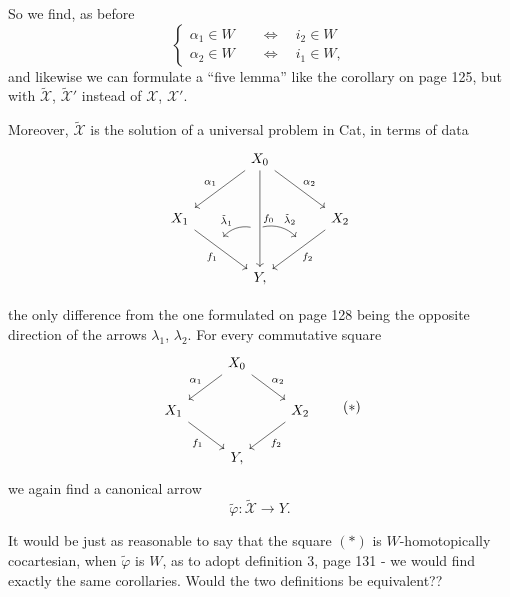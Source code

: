 \documentclass[11pt]{article}
\newcommand{\msp}[1]{\marginpar{\footnotesize [#1]}}
\newcommand{\sX}{\mathscr{X}}
\newcommand{\tX}{\tilde{\mathscr{X}}}
\begin{document}
So we find, as before
\[
\left\{
\begin{aligned}
\alpha_1 \in W &\quad\iff\quad i_2 \in W \\
\alpha_2 \in W &\quad\iff\quad i_1 \in W,
\end{aligned}
\right.
\]
and likewise we can formulate a ``five lemma'' like the corollary on page 125, but with $\tX$, $\tX'$ instead of $\sX$, $\sX'$.

Moreover, $\tX$ is the solution of a universal problem in Cat, in terms of data
\[
\begin{tikzcd}[row sep=large, column sep=large]
 & X_0 \arrow[dl, "\alpha_1"'] \arrow[dr, "\alpha_2"] \arrow[dd, "f_0", ""'{name=G0, pos=0.6}] & \\
X_1 \arrow[dr, "f_1"', ""{name=G1, pos=0.4}] & & X_2 \arrow[dl, "f_2", ""'{name=G2, pos=0.4}] \\
 & Y, &
\arrow[from=G0, to=G1, bend right, "\tilde{\lambda}_1"', shorten <=2pt, shorten >=2pt]
\arrow[from=G0, to=G2, bend left, "\tilde{\lambda}_2", shorten <=2pt, shorten >=2pt]
\end{tikzcd}
\]

\msp{page 136}
the only difference from the one formulated on page 128 being the opposite direction of the arrows $\lambda_1$, $\lambda_2$. For every commutative square
\[
\begin{tikzcd}
 & X_0 \arrow[dl, "\alpha_1"'] \arrow[dr, "\alpha_2"] & \\
X_1 \arrow[dr, "f_1"'] & & X_2 \arrow[dl, "f_2"] \\
 & Y, &
\end{tikzcd}
\tag*{$(*)$}
\]
we again find a canonical arrow
\[
\tilde{\varphi} : \tX \longrightarrow Y.
\]

It would be just as reasonable to say that the square $(*)$ is $W$-homotopically cocartesian, when $\tilde{\varphi}$ is $W$, as to adopt definition 3, page 131 - we would find exactly the same corollaries. Would the two definitions be equivalent?? %
\end{document}
